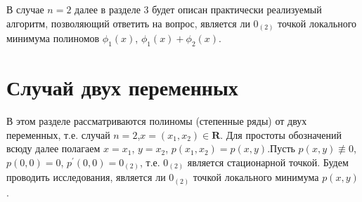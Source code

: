 \begin{remark}{В случае $n=2$ далее в разделе 3 будет описан практически реализуемый алгоритм, позволяющий ответить на вопрос, является ли $0_{(2)}$  точкой локального минимума полиномов $\phi_1(x)$, $\phi_1(x)+\phi_2(x)$.	}
\end{remark}

\section{Случай двух переменных} \label{nef:sec:2}
В этом разделе рассматриваются полиномы (степенные ряды) от двух переменных, т.е.  случай $n=2$,$x=(x_1,x_2)\in \mathbf{R}$. Для простоты обозначений всюду далее полагаем $x=x_1$, $y=x_2$, $p(x_1,x_2)=p(x,y)$.Пусть $p(x,y)\not\equiv0$, $p(0,0)=0$, $p^\prime(0,0)=0_{(2)}$, т.е. $0_{(2)}$ является стационарной точкой. Будем проводить исследования, является ли $0_{(2)}$ точкой локального минимума  $p(x,y)$.


